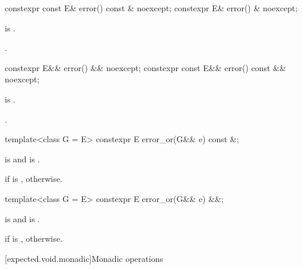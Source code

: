 %
\begin{itemdecl}
constexpr const E& error() const & noexcept;
constexpr E& error() & noexcept;
\end{itemdecl}

\begin{itemdescr}
\pnum
\hardexpects
{} is .

\pnum
\returns
{}.
\end{itemdescr}

%
\begin{itemdecl}
constexpr E&& error() && noexcept;
constexpr const E&& error() const && noexcept;
\end{itemdecl}

\begin{itemdescr}
\pnum
\hardexpects
{} is .

\pnum
\returns
{}.
\end{itemdescr}

%
\begin{itemdecl}
template<class G = E> constexpr E error_or(G&& e) const &;
\end{itemdecl}

\begin{itemdescr}
\pnum
\mandates
{} is  and
 is .

\pnum
\returns
{} if  is ,
 otherwise.
\end{itemdescr}

%
\begin{itemdecl}
template<class G = E> constexpr E error_or(G&& e) &&;
\end{itemdecl}

\begin{itemdescr}
\pnum
\mandates
{} is  and
 is .

\pnum
\returns
{} if  is ,
 otherwise.
\end{itemdescr}

[expected.void.monadic]{Monadic operations}

